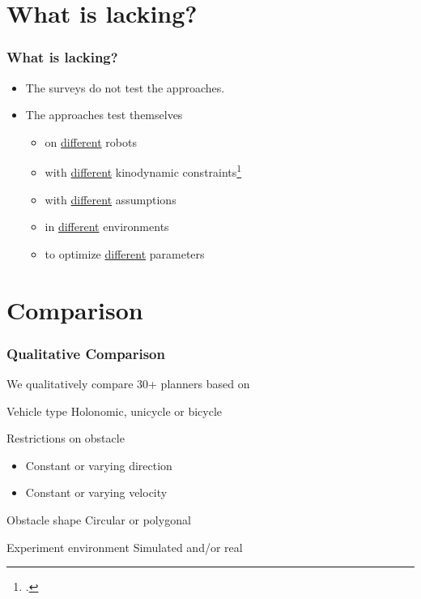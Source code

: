 \documentclass{beamer}
\begin{document}
\section{What is lacking?}
\begin{frame}
    \frametitle{\huge{What is lacking?}}
    \begin{itemize}
        \item The surveys do not test the approaches.
        \item The approaches test themselves
        \begin{itemize}
            \item on \underline{different} robots
            \item with \underline{different} kinodynamic constraints\footcite{hoy2015algorithms}
            \item with \underline{different} assumptions
            \item in \underline{different} environments 
            \item to optimize \underline{different} parameters
        \end{itemize}
    \end{itemize}
\end{frame}

\section{Comparison}
\begin{frame}
    \frametitle{\huge{Qualitative Comparison}}
        We qualitatively compare 30+ planners based on
            \begin{block}{Vehicle type}
                Holonomic, unicycle or bicycle
            \end{block}
            \begin{block}{Restrictions on obstacle}
                \begin{itemize}
                    \item Constant or varying direction
                    \item Constant or varying velocity
                \end{itemize}
            \end{block}
            \begin{block}{Obstacle shape}
                Circular or polygonal
            \end{block}
            \begin{block}{Experiment environment}
                Simulated and/or real
            \end{block}
\end{frame}
\end{document}
